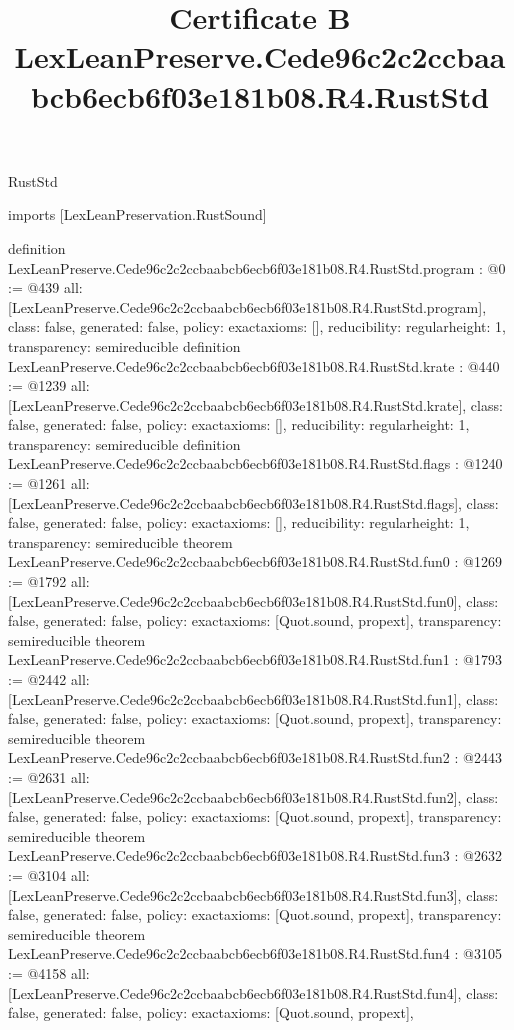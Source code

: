 \begin{lexlean}{RustStd}
\title{Certificate B LexLeanPreserve.Cede96c2c2ccbaabcb6ecb6f03e181b08.R4.RustStd}
\begin{coremodule}
imports [LexLeanPreservation.RustSound]

definition LexLeanPreserve.Cede96c2c2ccbaabcb6ecb6f03e181b08.R4.RustStd.program : @0 := @439 {
  all: [LexLeanPreserve.Cede96c2c2ccbaabcb6ecb6f03e181b08.R4.RustStd.program],
  class: false,
  generated: false,
  policy: exact{axioms: []},
  reducibility: regular{height: 1},
  transparency: semireducible
}
definition LexLeanPreserve.Cede96c2c2ccbaabcb6ecb6f03e181b08.R4.RustStd.krate : @440 := @1239 {
  all: [LexLeanPreserve.Cede96c2c2ccbaabcb6ecb6f03e181b08.R4.RustStd.krate],
  class: false,
  generated: false,
  policy: exact{axioms: []},
  reducibility: regular{height: 1},
  transparency: semireducible
}
definition LexLeanPreserve.Cede96c2c2ccbaabcb6ecb6f03e181b08.R4.RustStd.flags : @1240 := @1261 {
  all: [LexLeanPreserve.Cede96c2c2ccbaabcb6ecb6f03e181b08.R4.RustStd.flags],
  class: false,
  generated: false,
  policy: exact{axioms: []},
  reducibility: regular{height: 1},
  transparency: semireducible
}
theorem LexLeanPreserve.Cede96c2c2ccbaabcb6ecb6f03e181b08.R4.RustStd.fun0 : @1269 := @1792 {
  all: [LexLeanPreserve.Cede96c2c2ccbaabcb6ecb6f03e181b08.R4.RustStd.fun0],
  class: false,
  generated: false,
  policy: exact{axioms: [Quot.sound, propext]},
  transparency: semireducible
}
theorem LexLeanPreserve.Cede96c2c2ccbaabcb6ecb6f03e181b08.R4.RustStd.fun1 : @1793 := @2442 {
  all: [LexLeanPreserve.Cede96c2c2ccbaabcb6ecb6f03e181b08.R4.RustStd.fun1],
  class: false,
  generated: false,
  policy: exact{axioms: [Quot.sound, propext]},
  transparency: semireducible
}
theorem LexLeanPreserve.Cede96c2c2ccbaabcb6ecb6f03e181b08.R4.RustStd.fun2 : @2443 := @2631 {
  all: [LexLeanPreserve.Cede96c2c2ccbaabcb6ecb6f03e181b08.R4.RustStd.fun2],
  class: false,
  generated: false,
  policy: exact{axioms: [Quot.sound, propext]},
  transparency: semireducible
}
theorem LexLeanPreserve.Cede96c2c2ccbaabcb6ecb6f03e181b08.R4.RustStd.fun3 : @2632 := @3104 {
  all: [LexLeanPreserve.Cede96c2c2ccbaabcb6ecb6f03e181b08.R4.RustStd.fun3],
  class: false,
  generated: false,
  policy: exact{axioms: [Quot.sound, propext]},
  transparency: semireducible
}
theorem LexLeanPreserve.Cede96c2c2ccbaabcb6ecb6f03e181b08.R4.RustStd.fun4 : @3105 := @4158 {
  all: [LexLeanPreserve.Cede96c2c2ccbaabcb6ecb6f03e181b08.R4.RustStd.fun4],
  class: false,
  generated: false,
  policy: exact{axioms: [Quot.sound, propext]},
}
\end{coremodule}
\end{lexlean}

